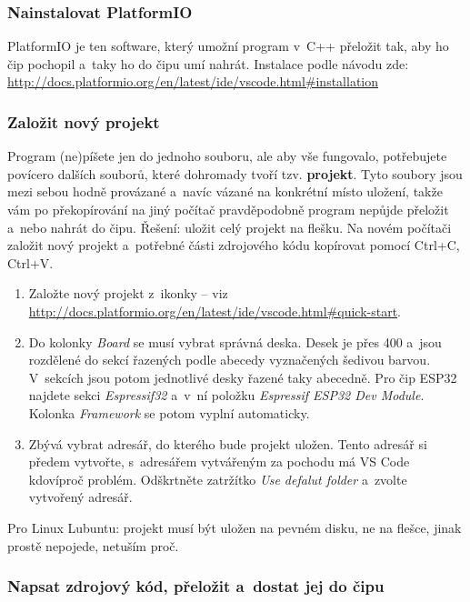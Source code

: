 \subsubsection{Nainstalovat PlatformIO} \label{platformio}

 PlatformIO je ten software, který umožní program v~C++ 
přeložit tak, aby ho čip pochopil a~taky ho do čipu umí nahrát. 
Instalace podle návodu zde: \url{http://docs.platformio.org/en/latest/ide/vscode.html\#installation}

\subsubsection{Založit nový projekt}

Program (ne)píšete jen do jednoho souboru, ale aby vše fungovalo, potřebujete povícero dalších souborů, které dohromady tvoří tzv. {\bf projekt}.
Tyto soubory jsou mezi sebou hodně provázané a~navíc vázané na konkrétní místo uložení, 
takže vám po překopírování na jiný počítač pravděpodobně program nepůjde přeložit a~nebo 
nahrát do čipu. Řešení: uložit celý projekt na flešku. 
Na novém počítači založit nový projekt a~potřebné části zdrojového kódu kopírovat pomocí Ctrl+C, Ctrl+V. 

\begin{enumerate}
\item  Založte nový projekt z~ikonky  -- viz \url{http://docs.platformio.org/en/latest/ide/vscode.html\#quick-start}.
\item  Do kolonky {\it Board} se musí vybrat správná deska.
Desek je přes 400 a~jsou rozdělené do sekcí řazených podle abecedy vyznačených šedivou barvou.
V~sekcích jsou potom jednotlivé desky řazené taky abecedně.
Pro čip ESP32 najdete sekci {\it Espressif32} a~v~ní položku {\it Espressif ESP32 Dev Module}.
Kolonka {\it Framework } se potom vyplní automaticky. 
\item  Zbývá vybrat adresář, do kterého bude projekt uložen.
Tento adresář si předem vytvořte, s~adresářem vytvářeným za pochodu má VS Code kdovíproč problém.
Odškrtněte zatržítko {\it Use defalut folder} a~zvolte vytvořený adresář.  
\end{enumerate}

Pro Linux Lubuntu: projekt musí být uložen na pevném disku, ne na flešce, jinak prostě nepojede, netuším proč.  

\subsubsection{Napsat zdrojový kód, přeložit a~dostat jej do čipu}

